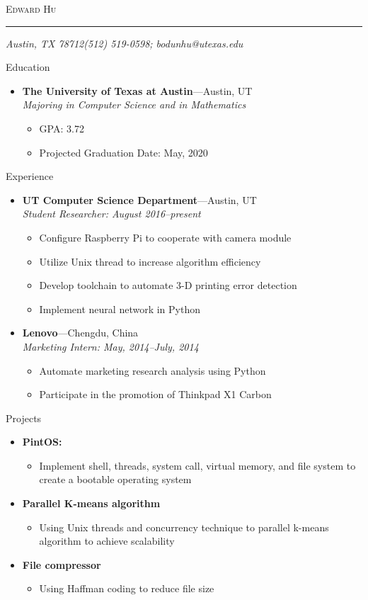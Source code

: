 \documentclass[11pt,oneside]{article}
\makeatletter
\newcommand{\name}{Edward Hu}
\newcommand{\addr}{Austin, TX 78712}
\newcommand{\phone}{(512) 519-0598}
\newcommand{\email}{bodunhu@utexas.edu}
\newcommand{\bigname}[1]{
	\begin{center}\fontfamily{phv}\selectfont\Huge\scshape#1\end{center}
}
\newenvironment{ressection}[1]{
	\vspace{4pt}
	{\fontfamily{phv}\selectfont\Large#1}
	\begin{itemize}
	\vspace{3pt}
}{
	\end{itemize}
}
\newcommand{\resitem}[1]{
	\vspace{-4pt}
	\item \begin{flushleft} #1 \end{flushleft}
}
\newcommand{\ressubitem}[1]{
	\vspace{-1pt}
	\item \begin{flushleft} #1 \end{flushleft}
}
\newcommand{\resbigitem}[3]{
	\vspace{-5pt}
	\item
	\textbf{#1}---#2 \\
	\textit{#3}
}
\newenvironment{ressubsec}[3]{
	\resbigitem{#1}{#2}{#3}
	\vspace{-2pt}
	\begin{itemize}
}{
	\end{itemize}
}
\newenvironment{reslist}[1]{
	\resitem{\textbf{#1}}
	\vspace{-5pt}
	\begin{itemize}
}{
	\end{itemize}
}
\makeatother
\begin{document}
 \selectfont

\bigname{\name}

\vspace{-8pt} \rule{\textwidth}{1pt}

\vspace{-1pt} {\small\itshape \addr \hfill \phone; \email}

\vspace{8 pt}




\begin{ressection}{Education}

	\begin{ressubsec}{The University of Texas at Austin}{Austin, UT}{Majoring in Computer Science and in Mathematics}
		\ressubitem{GPA: 3.72}
		\ressubitem{Projected Graduation Date: May, 2020}
	\end{ressubsec}

\end{ressection}


\begin{ressection}{Experience}

	\begin{ressubsec}{UT Computer Science Department}{Austin, UT}{Student Researcher: August 2016--present}
		\ressubitem{Configure Raspberry Pi to cooperate with camera module}
		\ressubitem{Utilize Unix thread to increase algorithm efficiency}
		\ressubitem{Develop toolchain to automate 3-D printing error detection}
		\ressubitem{Implement neural network in Python}
	\end{ressubsec}

	\begin{ressubsec}{Lenovo}{Chengdu, China}{Marketing Intern: May, 2014--July, 2014}
		\ressubitem{Automate marketing research analysis using Python}
		\ressubitem{Participate in the promotion of Thinkpad X1 Carbon}
	\end{ressubsec}

\end{ressection}

\begin{ressection}{Projects}

	\begin{reslist}{PintOS:}
		\ressubitem{Implement shell, threads, system call, virtual memory, and file system to create a bootable operating system}
	\end{reslist}
	
	\begin{reslist}{Parallel K-means algorithm}
		\ressubitem{Using Unix threads and concurrency technique to parallel k-means algorithm to achieve scalability}
	\end{reslist}
	
	\begin{reslist}{File compressor}
		\ressubitem{Using Haffman coding to reduce file size}
	\end{reslist}
\end{ressection}
\end{document}
